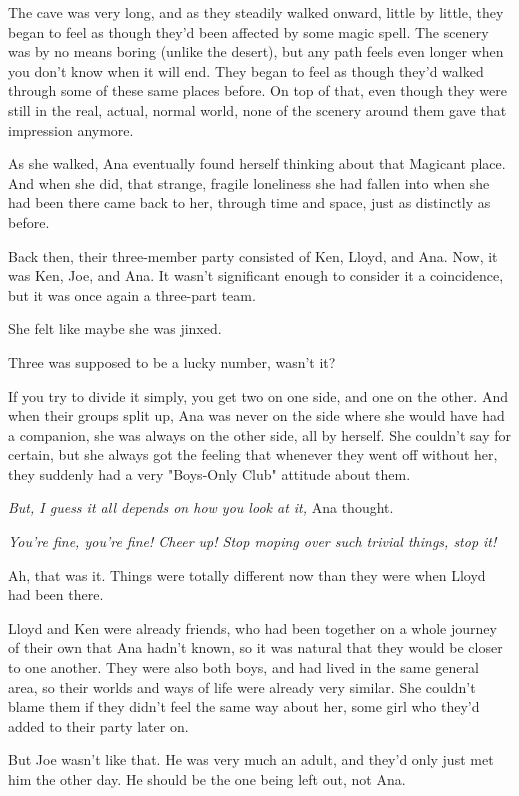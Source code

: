 \documentclass[
]{article}
\begin{document}
The cave was very long, and as they steadily walked onward, little by
little, they began to feel as though they'd been affected by some magic
spell. The scenery was by no means boring (unlike the desert), but any
path feels even longer when you don't know when it will end. They began
to feel as though they'd walked through some of these same places
before. On top of that, even though they were still in the real, actual,
normal world, none of the scenery around them gave that impression
anymore.

As she walked, Ana eventually found herself thinking about that Magicant
place. And when she did, that strange, fragile loneliness she had fallen
into when she had been there came back to her, through time and space,
just as distinctly as before.

Back then, their three-member party consisted of Ken, Lloyd, and Ana.
Now, it was Ken, Joe, and Ana. It wasn't significant enough to consider
it a coincidence, but it was once again a three-part team.

She felt like maybe she was jinxed.

Three was supposed to be a lucky number, wasn't it?

If you try to divide it simply, you get two on one side, and one on the
other. And when their groups split up, Ana was never on the side where
she would have had a companion, she was always on the other side, all by
herself. She couldn't say for certain, but she always got the feeling
that whenever they went off without her, they suddenly had a very
"Boys-Only Club" attitude about them.

\emph{But, I guess it all depends on how you look at it,} Ana thought.

\emph{You're fine, you're fine! Cheer up! Stop moping over such trivial
things, stop it!}

Ah, that was it. Things were totally different now than they were when
Lloyd had been there.

Lloyd and Ken were already friends, who had been together on a whole
journey of their own that Ana hadn't known, so it was natural that they
would be closer to one another. They were also both boys, and had lived
in the same general area, so their worlds and ways of life were already
very similar. She couldn't blame them if they didn't feel the same way
about her, some girl who they'd added to their party later on.

But Joe wasn't like that. He was very much an adult, and they'd only
just met him the other day. He should be the one being left out, not
Ana.
\end{document}
